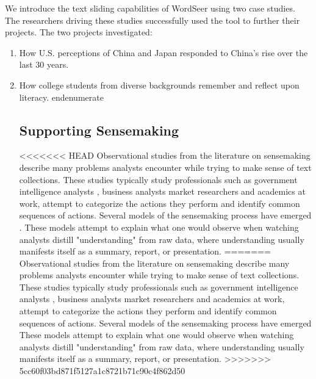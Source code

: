 \documentclass{sig-alternate}
\begin{document}
We introduce the text sliding capabilities of WordSeer using two case studies. The researchers driving these studies successfully used the tool to further their projects. The two projects investigated:
\begin{enumerate}
	\item How U.S. perceptions of China and Japan responded to China's rise over the last 30 years.
	\item How college students from diverse backgrounds remember and reflect upon literacy.
end{enumerate}


\subsection{Supporting Sensemaking}

<<<<<<< HEAD
Observational studies from the literature on sensemaking describe many problems analysts encounter while trying to make sense of text collections. These studies typically study professionals such as government intelligence analysts \cite{x}, business analysts \cite{x} market researchers \cite{x} and academics \cite{x} at work, attempt to categorize the actions they perform and identify common sequences of actions. Several models of the sensemaking process have emerged \cite{x}.  These models attempt to explain what one would observe when watching analysts distill "understanding" from raw data, where understanding usually manifests itself as a summary, report, or presentation.
=======
Observational studies from the literature on sensemaking describe many problems analysts encounter while trying to make sense of text collections. These studies typically study professionals such as government intelligence analysts \cite{pirolli_sensemaking_2005}, business analysts \cite{} market researchers \cite{x} and academics \cite{x} at work, attempt to categorize the actions they perform and identify common sequences of actions. Several models of the sensemaking process have emerged \cite{x} These models attempt to explain what one would observe when watching analysts distill "understanding" from raw data, where understanding usually manifests itself as a summary, report, or presentation.
>>>>>>> 5cc60f03bd871f5127a1c8721b71c90c4f862d50


\end{enumerate}
\end{document}
